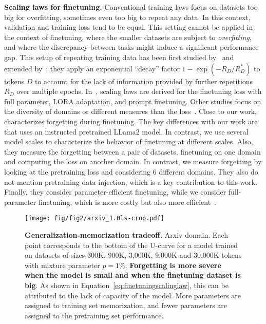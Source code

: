 \textbf{Scaling laws for finetuning.} Conventional training laws focus on datasets too big for overfitting, sometimes even too big to repeat any data. In this context, validation and training loss tend to be equal. This setting cannot be applied in the context of finetuning, where the smaller datasets are subject to \textit{overfitting}, and where the discrepancy between tasks might induce a significant performance gap. This setup of repeating training data has been first studied by~\citet{hernandez2021scalinglaws} and extended by~\citet{muennighoff2023scaling}: they apply an exponential ``decay'' factor $1-\exp{(-{R_D}/{R_D^*})}$ to tokens $D$ to account for the lack of information provided by further repetitions $R_D$ over multiple epochs. In~\citet{zhang2024when}, scaling laws are derived for the finetuning loss with full parameter, LORA adaptation, and prompt finetuning.
Other studies focus on the diversity of domains or different measures than the loss~\citep{barnett2024empirical,isik2024scaling}. 
Close to our work,~\citet{kalajdzievski2024scaling} characterizes forgetting during finetuning. 
The key differences with our work are that \citet{kalajdzievski2024scaling} uses an instructed pretrained LLama2 model. In contrast, we use several model scales to characterize the behavior of finetuning at different scales. 
Also, they measure the forgetting between a pair of datasets, finetuning on one domain and computing the loss on another domain.
In contrast, we measure forgetting by looking at the pretraining loss and considering 6 different domains.
They also do not mention pretraining data injection, which is a key contribution to this work. 
Finally, they consider parameter-efficient finetuning, while we consider full-parameter finetuning, which is more costly but also more efficient~\citep{zhang2024when}.

\begin{figure}[t]
    \centering
    \texttt{[image: fig/fig2/arxiv\_1.0ls-crop.pdf]}
    \caption{\textbf{Generalization-memorization tradeoff.} Arxiv domain. Each point corresponds to the bottom of the U-curve for a model trained on datasets of sizes 300K, 900K, 3,000K, 9,000K and 30,000K tokens with mixture parameter $p=1\%$. \textbf{Forgetting is more severe when the model is small and when the finetuning dataset is big}. As shown in Equation~\ref{eq:finetuningscalinglaw}, this can be attributed to the lack of capacity of the model. More parameters are assigned to training set memorization, and fewer parameters are assigned to the pretraining set performance.}
    \label{fig:paretoplot}
\end{figure}